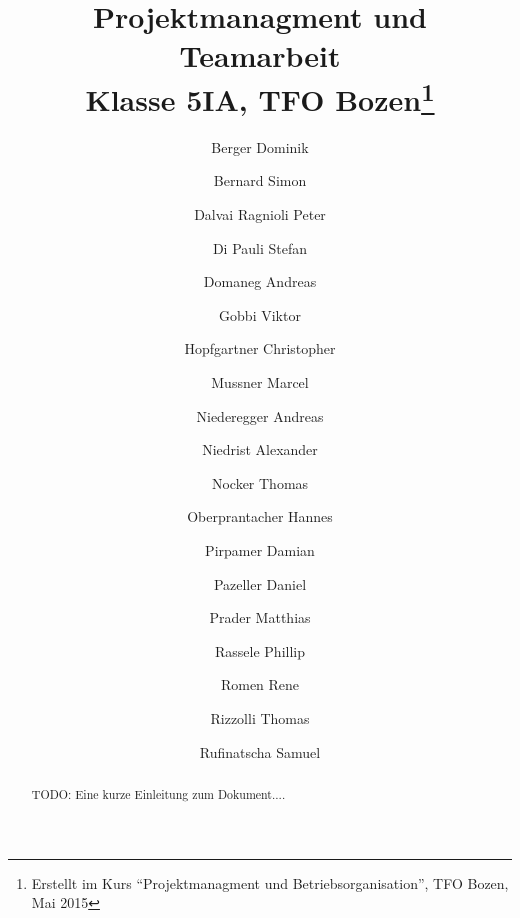 \documentclass{article}
\title{Projektmanagment und Teamarbeit\\Klasse 5IA, TFO Bozen\thanks{Erstellt 
im Kurs ``Projektmanagment und Betriebsorganisation'', TFO Bozen, Mai 2015}}
\author{Berger Dominik
\and Bernard Simon
\and Dalvai Ragnioli Peter
\and Di Pauli Stefan
\and Domaneg Andreas
\and Gobbi Viktor
\and Hopfgartner Christopher
\and Mussner Marcel
\and Niederegger Andreas
\and Niedrist Alexander
\and Nocker Thomas
\and Oberprantacher Hannes
\and Pirpamer Damian
\and Pazeller Daniel
\and Prader Matthias
\and Rassele Phillip
\and Romen Rene
\and Rizzolli Thomas
\and Rufinatscha Samuel}
\begin{document}
\maketitle


\begin{abstract}
 TODO: Eine kurze Einleitung zum Dokument....
\end{abstract}

\newpage


\begin{sloppypar}
\tableofcontents























\end{sloppypar}
\end{document}

